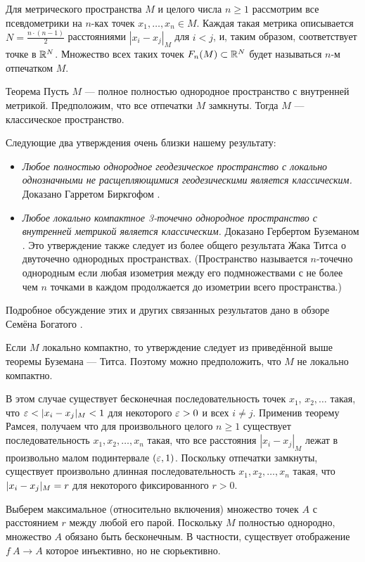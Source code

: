 \documentclass[a4paper,10pt]{article}
\begin{document}
Для метрического пространства $M$ и целого числа $n\ge1$ рассмотрим все псевдометрики на $n$-ках точек 
$x_1,\dots, x_n\in M$.
Каждая такая метрика описывается $N=\tfrac{n\cdot (n-1)}2$ расстояниями $|x_i-x_j|_M$ для $i<j$, и, таким образом, соответствует точке в $\mathbb{R}^N$.
Множество всех таких точек $F_n(M)\z\subset \RR^N$ будет называться $n$-м отпечатком $M$.

\begin{thm}{Теорема}\label{all-sets}
Пусть $M$ --- полное полностью однородное пространство с внутренней метрикой.
Предположим, что все отпечатки $M$ замкнуты.
Тогда $M$ --- классическое пространство.
\end{thm}

Следующие два утверждения очень близки нашему результату:
\begin{itemize}
\item \emph{Любое полностью однородное геодезическое пространство с локально однозначными не расщепляющимися геодезическими является классическим.} Доказано Гарретом Биркгофом  \cite{birkhoff}.
\item \emph{Любое локально компактное 3-точечно однородное пространство с внутренней метрикой  является классическим.} 
Доказано Гербертом Буземаном \cite{busemann}.
Это утверждение также следует из более общего результата Жака Титса \cite{tits} о двуточечно однородных пространствах.
(Пространство называется $n$-точечно однородным если любая изометрия между его подмножествами с не более чем $n$ точками в каждом продолжается до изометрии всего пространства.)
\end{itemize}
Подробное обсуждение этих и других связанных результатов дано в обзоре Семёна Богатого \cite{bogaty-ru}.

Если $M$ локально компактно, то утверждение следует из приведённой выше теоремы Буземана --- Титса.
Поэтому можно предположить, что $M$ не локально компактно.

В этом случае существует бесконечная последовательность точек $x_1$, $x_2,\dots$ такая, что $\eps<|x_i-x_j|_M<1$ для некоторого $\varepsilon>0$ и всех $i\ne j$.
Применив теорему Рамсея, получаем что для произвольного целого $n\ge 1$ существует последовательность $x_1,x_2,\dots,x_n$ такая, что все расстояния $|x_i-x_j|_M$ лежат в произвольно малом подинтервале $(\varepsilon,1)$.
Поскольку отпечатки замкнуты, существует произвольно длинная последовательность $x_1,x_2,\dots,x_n$ такая, что
$|x_i\z-x_j|_M= r$ для некоторого фиксированного $r>0$.

Выберем максимальное (относительно включения) множество точек $A$ с расстоянием $r$ между любой его парой.
Поскольку $M$ полностью однородно, множество $A$ обязано быть бесконечным.
В частности, существует отображение $f\:A\to A$ которое инъективно, но не сюрьективно.
\end{document}
